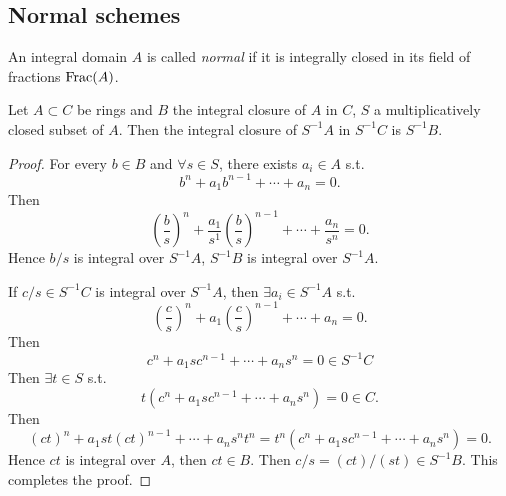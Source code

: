 \subsection{Normal schemes }


    \begin{definition}\label{def: normal domain}
        An integral domain $A$ is called \textit{normal} if it is integrally closed in its field of fractions $\operatorname{Frac}(A)$.
    \end{definition}

    \begin{lemma}\label{lem: integral closed under localization}
        Let $A \subset C$ be rings and $B$ the integral closure of $A$ in $C$, $S$ a multiplicatively closed subset of $A$.
        Then the integral closure of  $S^{-1}A$ in $S^{-1}C$ is $S^{-1}B$.
    \end{lemma}
    \begin{proof}
            For every $b \in B$ and $\forall s \in S$, there exists $a_i \in A$ s.t. 
            \[ 
                b^n + a_1 b^{n-1} + \cdots + a_n = 0.
            \] 
            Then 
            \[ 
                \left( \frac{b}{s} \right)^n + \frac{a_1}{s^1} \left( \frac{b}{s} \right)^{n-1} + \cdots + \frac{a_n}{s^n} = 0.
            \] 
            Hence $b/s$ is integral over $S^{-1}A$, $S^{-1}B$ is integral over $S^{-1}A$.

            If $c/s \in S^{-1}C$ is integral over $S^{-1}A$, then $\exists a_i \in S^{-1}A$ s.t.
            \[ 
                \left( \frac{c}{s} \right)^n + a_1 \left( \frac{c}{s} \right)^{n-1} + \cdots + a_n = 0.
            \]
            Then 
            \[ 
                c^n + a_1 s c^{n-1} + \cdots + a_n s^n = 0 \in S^{-1}C
            \] 
            Then $\exists t \in S$ s.t. 
            \[
                t (c^n + a_1 s c^{n-1} + \cdots + a_n s^n) = 0 \in C.
            \] 
            Then 
            \[ 
                (ct)^n + a_1 s t (ct)^{n-1} + \cdots + a_n s^n t^n  = t^n (c^n + a_1 s c^{n-1} + \cdots + a_n s^n) = 0.
            \] 
            Hence $ct$ is integral over $A$, then $ct \in B$.
            Then $c/s = (ct)/(st) \in S^{-1}B$.
            This completes the proof.
    \end{proof}


